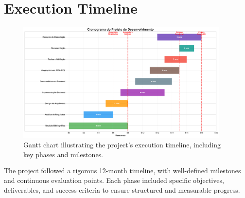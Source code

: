 \section{Execution Timeline}

\begin{figure}[htbp]
    \centering
    \includegraphics[width=0.95\textwidth]{images/generated/project_timeline.png}
    \caption{Gantt chart illustrating the project's execution timeline, including key phases and milestones.}
    \label{fig:project-timeline}
\end{figure}

The project followed a rigorous 12-month timeline, with well-defined milestones and continuous evaluation points. Each phase included specific objectives, deliverables, and success criteria to ensure structured and measurable progress.